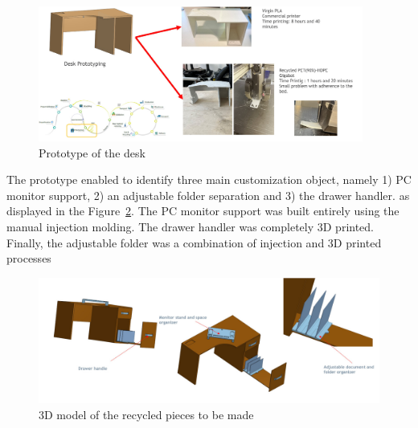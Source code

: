 \documentclass[
  11pt,
]{article}
\begin{document}
\begin{figure}[H]

{\centering \includegraphics[width=0.95\textwidth,height=\textheight]{figures/demos/desk/desk-01.jpg}

}

\caption{\label{fig-desk-01}Prototype of the desk}

\end{figure}

The prototype enabled to identify three main customization object,
namely 1) PC monitor support, 2) an adjustable folder separation and 3)
the drawer handler. as displayed in the Figure~\ref{fig-desk-01}. The PC
monitor support was built entirely using the manual injection molding.
The drawer handler was completely 3D printed. Finally, the adjustable
folder was a combination of injection and 3D printed processes

\begin{figure}[H]

{\centering \includegraphics{figures/demos/desk/desk-02.jpg}

}

\caption{\label{fig-desk-01}3D model of the recycled pieces to be made}

\end{figure}
\end{document}
